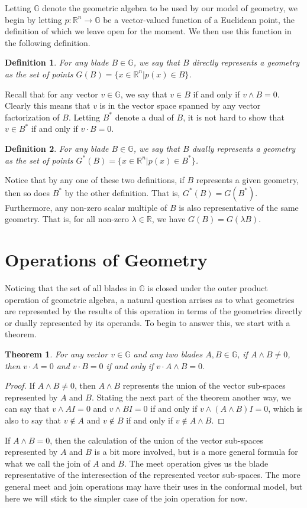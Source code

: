\documentclass[12pt]{article}
\newcommand{\G}{\mathbb{G}}
\newcommand{\R}{\mathbb{R}}
\newtheorem{theorem}{Theorem}[section]
\newtheorem{definition}{Definition}[section]
\begin{document}
Letting $\G$ denote the geometric algebra to be used by our model
of geometry, we begin by letting $p:\R^n\to\G$ be a vector-valued
function of a Euclidean point, the definition of which we leave
open for the moment.  We then use this function in the following definition.
\begin{definition}\label{def_direct_rep}
For any blade $B\in\G$, we say that $B$ directly
represents a geometry as the set of points
$G(B)=\{x\in\R^n|p(x)\in B\}$.
\end{definition}
Recall that for any vector $v\in\G$, we say that $v\in B$ if and only if $v\wedge B=0$.
Clearly this means that $v$ is in the vector space spanned by any vector factorization
of $B$.  Letting $B^*$ denote a dual of $B$, it is not hard to show that
$v\in B^*$ if and only if $v\cdot B=0$.
\begin{definition}\label{def_dual_rep}
For any blade $B\in\G$, we say that $B$ dually
represents a geometry as the set of points
$G^*(B)=\{x\in\R^n|p(x)\in B^*\}$.
\end{definition}
Notice that by any one of these two definitions, if $B$ represents
a given geometry, then so does $B^*$ by the other definition.
That is, $G^*(B)=G(B^*)$.
Furthermore, any non-zero scalar multiple of $B$ is also representative
of the same geometry.  That is, for all non-zero $\lambda\in\R$,
we have $G(B)=G(\lambda B)$.

\section{Operations of Geometry}

Noticing that the set of all blades in $\G$ is closed under the
outer product operation of geometric algebra,
a natural question arrises as to what geometries are represented
by the results of this operation in terms of
the geometries directly or dually represented by its operands.  To begin to answer this,
we start with a theorem.
\begin{theorem}\label{thm_intersect}
For any vector $v\in\G$ and any two blades $A,B\in\G$,
if $A\wedge B\neq 0$, then $v\cdot A=0$ and $v\cdot B=0$ if and only if $v\cdot A\wedge B=0$.
\end{theorem}
\begin{proof}
If $A\wedge B\neq 0$, then $A\wedge B$ represents the union of the vector sub-spaces
represented by $A$ and $B$.  Stating the next part of the theorem another way, we can
say that $v\wedge AI=0$ and $v\wedge BI=0$ if and only if $v\wedge (A\wedge B)I=0$,
which is also to say that $v\not\in A$ and $v\not\in B$ if and only if $v\not\in A\wedge B$.
\end{proof}
If $A\wedge B=0$, then the calculation of the union of the vector sub-spaces represented by
$A$ and $B$ is a bit more involved, but is a more general formula for what we call the join
of $A$ and $B$.  The meet operation gives us the blade representative of the interesection
of the represented vector sub-spaces. The more general meet and join
operations may have their uses in the conformal model, but here we will stick to the
simpler case of the join operation for now.
\end{document}
